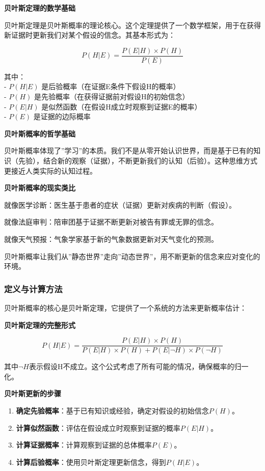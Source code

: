 \documentclass[
]{book}
\begin{document}
\textbf{贝叶斯定理的数学基础}

贝叶斯定理是贝叶斯概率的理论核心。这个定理提供了一个数学框架，用于在获得新证据时更新我们对某个假设的信念。其基本形式为：

\[P(H|E) = \frac{P(E|H) \times P(H)}{P(E)}\]

其中：\\
- \(P(H|E)\) 是后验概率（在证据E条件下假设H的概率）\\
- \(P(H)\) 是先验概率（在获得证据前对假设H的初始信念）\\
- \(P(E|H)\) 是似然函数（在假设H成立时观察到证据E的概率）\\
- \(P(E)\) 是证据的边际概率

\textbf{贝叶斯概率的哲学基础}

贝叶斯概率体现了''学习''的本质。我们不是从零开始认识世界，而是基于已有的知识（先验），结合新的观察（证据），不断更新我们的认知（后验）。这种思维方式更接近人类实际的认知过程。

\textbf{贝叶斯概率的现实类比}

就像医学诊断：医生基于患者的症状（证据）更新对疾病的判断（假设）。

就像法庭审判：陪审团基于证据不断更新对被告有罪或无罪的信念。

就像天气预报：气象学家基于新的气象数据更新对天气变化的预测。

贝叶斯概率让我们从''静态世界''走向''动态世界''，用不断更新的信念来应对变化的环境。

\hypertarget{ux5b9aux4e49ux4e0eux8ba1ux7b97ux65b9ux6cd5-1}{%
\subsubsection{定义与计算方法}\label{ux5b9aux4e49ux4e0eux8ba1ux7b97ux65b9ux6cd5-1}}

贝叶斯概率的核心是贝叶斯定理，它提供了一个系统的方法来更新概率估计：

\textbf{贝叶斯定理的完整形式}

\[P(H|E) = \frac{P(E|H) \times P(H)}{P(E|H) \times P(H) + P(E|\neg H) \times P(\neg H)}\]

其中\(\neg H\)表示假设H不成立。这个公式考虑了所有可能的情况，确保概率的归一化。

\textbf{贝叶斯更新的步骤}

\begin{enumerate}
\def\labelenumi{\arabic{enumi}.}
\item
  \textbf{确定先验概率}：基于已有知识或经验，确定对假设的初始信念\(P(H)\)。
\item
  \textbf{计算似然函数}：评估在假设成立时观察到证据的概率\(P(E|H)\)。
\item
  \textbf{计算证据概率}：计算观察到证据的总体概率\(P(E)\)。
\item
  \textbf{计算后验概率}：使用贝叶斯定理更新信念，得到\(P(H|E)\)。
\end{enumerate}
\end{document}
